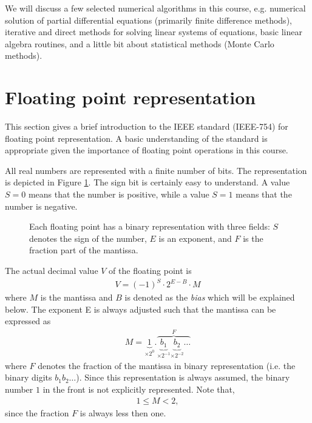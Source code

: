 We will discuss a few selected numerical algorithms in this course, e.g.
numerical solution of partial differential equations (primarily finite
difference methods), iterative and direct methods for solving linear systems of
equations, basic linear algebra routines, and a little bit about statistical
methods (Monte Carlo methods).

\section{Floating point representation}

This section gives a brief introduction to the IEEE standard (IEEE-754) for
floating point representation. A basic understanding of the standard is
appropriate given the importance of floating point operations in this course.

All real numbers are represented with a finite number of bits. The
representation is depicted in Figure \ref{fig:fp}. The sign bit is certainly
easy to understand. A value $S=0$ means that the number is positive, while a
value $S=1$ means that the number is negative.

\begin{figure}
  \centering
  
  \caption{
    Each floating point has a binary representation with three fields: $S$
    denotes the sign of the number, $E$ is an exponent, and $F$ is the fraction
    part of the mantissa.
  }
  \label{fig:fp}
\end{figure}

The actual decimal value $V$ of the floating point is
\begin{align}
  V = (-1)^S \cdot 2^{E-B}\cdot M
\end{align}
where $M$ is the mantissa and $B$ is denoted as the \emph{bias} which will be
explained below. The exponent E is always adjusted such that the mantissa can be
expressed as
\begin{align}
  M = \underbrace{1}_{\times2^0} .
  \overbrace{\underbrace{b_1}_{\times2^{-1}}
  \underbrace{b_2}_{\times2^{-2}}\ldots}^{F}
\end{align}
where $F$ denotes the fraction of the mantissa in binary representation (i.e.
the binary digits $b_1b_2\ldots$). Since this representation is always assumed,
the binary number $1$ in the front is not explicitly represented. Note that,
\begin{align}
  1 \leq M < 2,
\end{align}
since the fraction $F$ is always less then one.

